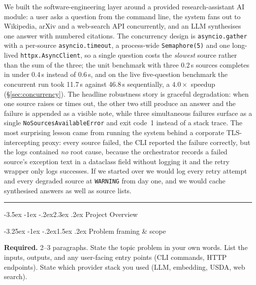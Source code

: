 \documentclass[11pt,a4paper]{article}
\makeatletter
\renewcommand\section{\@startsection{section}{1}{\z@}%
    {-3.5ex \@plus -1ex \@minus -.2ex}{2.3ex \@plus .2ex}%
    {\normalfont\Large\bfseries\color{accent}}}%
\renewcommand\subsection{\@startsection{subsection}{2}{\z@}%
    {-3.25ex \@plus -1ex \@minus -.2ex}{1.5ex \@plus .2ex}%
    {\normalfont\large\bfseries\color{accent}}}%
\makeatother
\begin{document}
We built the software-engineering layer around a provided research-assistant AI module: a user asks a question from the command line, the system fans out to Wikipedia, arXiv and a web-search API concurrently, and an LLM synthesises one answer with numbered citations. The concurrency design is \texttt{asyncio.gather} with a per-source \texttt{asyncio.timeout}, a process-wide \texttt{Semaphore(5)} and one long-lived \texttt{httpx.AsyncClient}, so a single question costs the \emph{slowest} source rather than the sum of the three; the unit benchmark with three 0.2\,s sources completes in under 0.4\,s instead of 0.6\,s, and on the live five-question benchmark the concurrent run took 11.7\,s against 46.8\,s sequentially, a $4.0\times$ speedup (\S\ref{sec:concurrency}). The headline robustness story is graceful degradation: when one source raises or times out, the other two still produce an answer and the failure is appended as a visible note, while three simultaneous failures surface as a single \texttt{NoSourcesAvailableError} and exit code~1 instead of a stack trace. The most surprising lesson came from running the system behind a corporate TLS-intercepting proxy: every source failed, the CLI reported the failure correctly, but the logs contained \emph{no} root cause, because the orchestrator records a failed source's exception text in a dataclass field without logging it and the retry wrapper only logs successes. If we started over we would log every retry attempt and every degraded source at \texttt{WARNING} from day one, and we would cache synthesised answers as well as source lists.

\tableofcontents
\vspace{0.6em}\hrule\vspace{0.4em}

\section{Project Overview}

\subsection{Problem framing \& scope}

\begin{deliverbox}
\textbf{Required.} 2--3 paragraphs. State the topic problem in your own words. List the inputs, outputs, and any user-facing entry points (CLI commands, HTTP endpoints). State which provider stack you used (LLM, embedding, USDA, web search).
\end{deliverbox}
\end{document}
